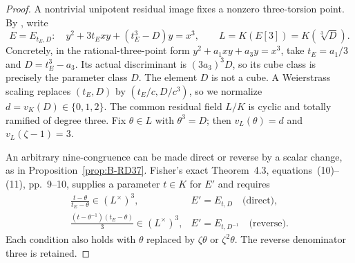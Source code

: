 \begin{proof}
A nontrivial unipotent residual image fixes a nonzero three-torsion
point. By \citet[Lemmas~4.1--4.2, p.~8]{Fisher2015Nine}, write
\[
 E=E_{t_E,D}:\quad y^2+3t_Exy+(t_E^3-D)y=x^3,
 \qquad L=K(E[3])=K(\sqrt[3]D).
                                                        \tag{B-RD39.4}
\]
Concretely, in the rational-three-point form
$y^2+a_1xy+a_3y=x^3$, take $t_E=a_1/3$ and
$D=t_E^3-a_3$. Its actual discriminant is $(3a_3)^3D$,
so its cube class is precisely the parameter class $D$.
The element $D$ is not a cube. A Weierstrass scaling replaces
$(t_E,D)$ by $(t_E/c,D/c^3)$, so we normalize
$d=v_K(D)\in\{0,1,2\}$. The common residual field $L/K$ is
cyclic and totally ramified of degree three. Fix $\theta\in L$
with $\theta^3=D$; then $v_L(\theta)=d$ and
$v_L(\zeta-1)=3$.

An arbitrary nine-congruence can be made direct or reverse by a scalar
change, as in Proposition~\ref{prop:B-RD37}. Fisher's exact
Theorem~4.3, equations~(10)--(11), pp.~9--10, supplies a parameter
$t\in K$ for $E'$ and requires
\[
\begin{array}{ll}
 \displaystyle\frac{t-\theta}{t_E-\theta}\in(L^\times)^3,
   &E'=E_{t,D}\quad\text{(direct)},\\[6pt]
 \displaystyle\frac{(t-\theta^{-1})(t_E-\theta)}3
                 \in(L^\times)^3,
   &E'=E_{t,D^{-1}}\quad\text{(reverse)}.
\end{array}                                             \tag{B-RD39.5}
\]
Each condition also holds with $\theta$ replaced by $\zeta\theta$
or $\zeta^2\theta$. The reverse denominator three is retained.


\end{proof}
